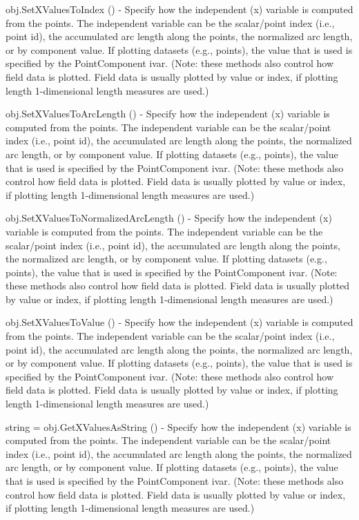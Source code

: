 \begin{DoxyItemize}
\item {\ttfamily obj.\-Set\-X\-Values\-To\-Index ()} -\/ Specify how the independent (x) variable is computed from the points. The independent variable can be the scalar/point index (i.\-e., point id), the accumulated arc length along the points, the normalized arc length, or by component value. If plotting datasets (e.\-g., points), the value that is used is specified by the Point\-Component ivar. (Note\-: these methods also control how field data is plotted. Field data is usually plotted by value or index, if plotting length 1-\/dimensional length measures are used.)  
\item {\ttfamily obj.\-Set\-X\-Values\-To\-Arc\-Length ()} -\/ Specify how the independent (x) variable is computed from the points. The independent variable can be the scalar/point index (i.\-e., point id), the accumulated arc length along the points, the normalized arc length, or by component value. If plotting datasets (e.\-g., points), the value that is used is specified by the Point\-Component ivar. (Note\-: these methods also control how field data is plotted. Field data is usually plotted by value or index, if plotting length 1-\/dimensional length measures are used.)  
\item {\ttfamily obj.\-Set\-X\-Values\-To\-Normalized\-Arc\-Length ()} -\/ Specify how the independent (x) variable is computed from the points. The independent variable can be the scalar/point index (i.\-e., point id), the accumulated arc length along the points, the normalized arc length, or by component value. If plotting datasets (e.\-g., points), the value that is used is specified by the Point\-Component ivar. (Note\-: these methods also control how field data is plotted. Field data is usually plotted by value or index, if plotting length 1-\/dimensional length measures are used.)  
\item {\ttfamily obj.\-Set\-X\-Values\-To\-Value ()} -\/ Specify how the independent (x) variable is computed from the points. The independent variable can be the scalar/point index (i.\-e., point id), the accumulated arc length along the points, the normalized arc length, or by component value. If plotting datasets (e.\-g., points), the value that is used is specified by the Point\-Component ivar. (Note\-: these methods also control how field data is plotted. Field data is usually plotted by value or index, if plotting length 1-\/dimensional length measures are used.)  
\item {\ttfamily string = obj.\-Get\-X\-Values\-As\-String ()} -\/ Specify how the independent (x) variable is computed from the points. The independent variable can be the scalar/point index (i.\-e., point id), the accumulated arc length along the points, the normalized arc length, or by component value. If plotting datasets (e.\-g., points), the value that is used is specified by the Point\-Component ivar. (Note\-: these methods also control how field data is plotted. Field data is usually plotted by value or index, if plotting length 1-\/dimensional length measures are used.)  

\end{DoxyItemize}

